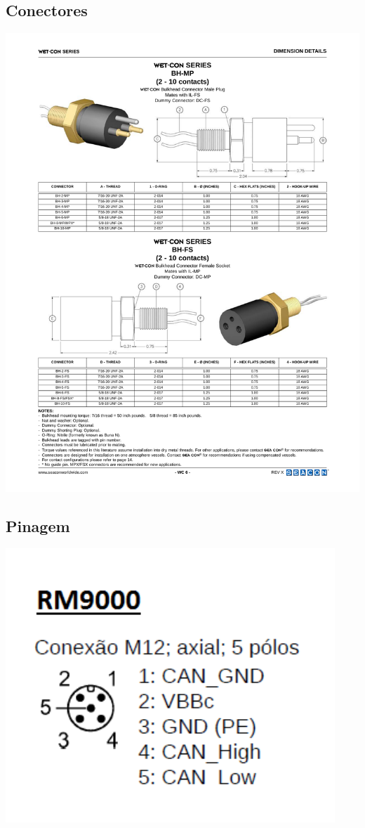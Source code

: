 \subsection{Conectores}
\includegraphics[width=1\columnwidth]{figs/datasheets/WETCON.pdf}

\subsection{Pinagem}
\includegraphics[width=1\columnwidth]{figs/datasheets/pinout.pdf}


